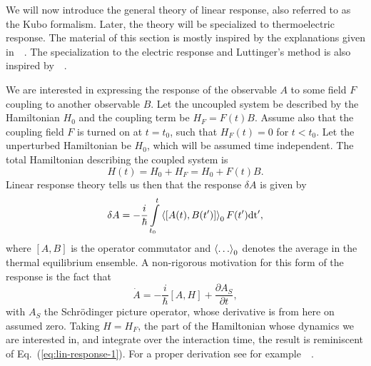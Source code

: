 We will now introduce the general theory of linear response, also referred to as the Kubo formalism.
Later, the theory will be specialized to thermoelectric response.
The material of this section is mostly inspired by the explanations given in~\citeauthor{giulianiQuantumTheoryElectron2005}~\cite{giulianiQuantumTheoryElectron2005}.
The specialization to the electric response and Luttinger's method is also inspired by~\citeauthor{mahanManyparticlePhysics2000}~\cite{mahanManyparticlePhysics2000}.


We are interested in expressing the response of the observable ${A}$ to some field $F$ coupling to another observable ${B}$.
Let the uncoupled system be described by the Hamiltonian $H_{0}$ and the coupling term be $H_F = F(t) {B}$.
Assume also that the coupling field $F$ is turned on at $t=t_0$,  such that $H_F(t) = 0$ for $t < t_0$.
Let the unperturbed Hamiltonian be $H_0$, which will be assumed time independent.
The total Hamiltonian describing the coupled system is
\begin{equation}
  \label{eq:kubo-perturbation}
{H}(t) = H_0 + H_F = H_0+ F(t) {B}.
\end{equation}
Linear response theory tells us then that the response $\delta {A}$ is given by~\cite{giulianiQuantumTheoryElectron2005}
\begin{equation}\label{eq:lin-response-1}
  \delta {A} = -\frac{i}{\hbar} \int\limits_{t_0}^t
  \Braket{\left[
{A}(t), {B}(t')
\right]}_{0}
F(t') \mathrm{dt'},
\end{equation}
where $[{A}, {B}]$ is the operator commutator and $\braket{\dots}_0$ denotes the average in the thermal equilibrium ensemble.
A  non-rigorous motivation for this form of the response is the fact that
\begin{equation}
  \dot{{A}} = -\frac{i}{\hbar } \left[ {A}, H \right]
  + \frac{\partial {A}_{S}}{\partial t}, 
\end{equation}
with $A_S$ the Schrödinger picture operator, whose derivative is from here on assumed zero.
Taking $H=H_F$, the part of the Hamiltonian whose dynamics we are interested in, and integrate over the interaction time, the result is reminiscent of Eq.~(\ref{eq:lin-response-1}).
For a proper derivation see for example~\citeauthor{giulianiQuantumTheoryElectron2005}~\cite[Chapter 3.3]{giulianiQuantumTheoryElectron2005}.

